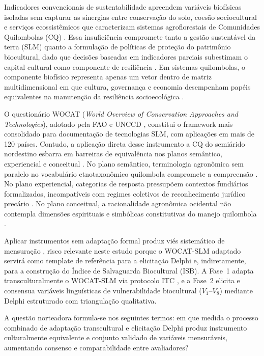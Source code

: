 \documentclass[3p,times]{elsarticle}
\begin{document}
Indicadores convencionais de sustentabilidade apreendem variáveis biofísicas isoladas sem capturar as sinergias entre conservação do solo, coesão sociocultural e serviços ecossistêmicos que caracterizam sistemas agroflorestais de Comunidades Quilombolas (CQ) \citep{Costanza1997,Dale2001}. Essa insuficiência compromete tanto a gestão sustentável da terra (SLM) quanto a formulação de políticas de proteção do patrimônio biocultural, dado que decisões baseadas em indicadores parciais subestimam o capital cultural como componente de resiliência \citep{Berkes2017}. Em sistemas quilombolas, o componente biofísico representa apenas um vetor dentro de matriz multidimensional em que cultura, governança e economia desempenham papéis equivalentes na manutenção da resiliência socioecológica \citep{Toledo2008}.


O questionário WOCAT (\textit{World Overview of Conservation Approaches and Technologies}), adotado pela FAO e UNCCD \citep{Liniger2019,Schwilch2012}, constitui o framework mais consolidado para documentação de tecnologias SLM, com aplicações em mais de 120 países. Contudo, a aplicação direta desse instrumento a CQ do semiárido nordestino esbarra em barreiras de equivalência nos planos semântico, experiencial e conceitual \citep{Herdman1999}. No plano semântico, terminologia agronômica sem paralelo no vocabulário etnotaxonômico quilombola compromete a compreensão \citep{Rist2006,Quave2014}. No plano experiencial, categorias de resposta pressupõem contextos fundiários formalizados, incompatíveis com regimes coletivos de reconhecimento jurídico precário \citep{Almeida2011}. No plano conceitual, a racionalidade agronômica ocidental não contempla dimensões espirituais e simbólicas constitutivas do manejo quilombola \citep{Santos2007,Toledo2008}.

Aplicar instrumentos sem adaptação formal produz viés sistemático de mensuração \citep{Guillemin1993}, risco relevante neste estudo porque o WOCAT-SLM adaptado servirá como template de referência para a elicitação Delphi e, indiretamente, para a construção do Índice de Salvaguarda Biocultural (ISB). A Fase~1 adapta transculturalmente o WOCAT-SLM via protocolo ITC \citep{Beaton2000}, e a Fase~2 elicita e consensua variáveis linguísticas de vulnerabilidade biocultural ($V_1$--$V_8$) mediante Delphi estruturado com triangulação qualitativa.

A questão norteadora formula-se nos seguintes termos: em que medida o processo combinado de adaptação transcultural e elicitação Delphi produz instrumento culturalmente equivalente e conjunto validado de variáveis mensuráveis, aumentando consenso e comparabilidade entre avaliadores?
\end{document}

